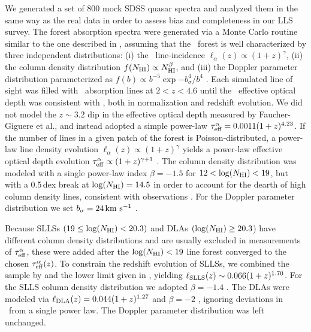 \documentclass[12pt,preprint]{aastex}
\begin{document}
We generated a set of 800 mock SDSS quasar 
spectra and analyzed them in the same way as the real data in 
order to assess bias and completeness in our LLS survey. 
The  forest absorption spectra 
were generated via a Monte Carlo routine similar 
to the one described in \cite{dww08}, 
assuming that the \lya\ forest is well characterized by 
three independent distributions: 
(i) the \lya\
line-incidence $\ell_\alpha (z) \propto (1+z)^\gamma$, 
(ii) the  column density distribution $f(N_{\rm HI}) \propto N_{\rm HI}^\beta$, 
and (iii) the Doppler parameter distribution parameterized as 
$f(b) \propto b^{-5} \exp{-b_\sigma^4/b^4}$ \citep{hr99}. 
Each simulated line of sight was filled with  \lya\ absorption lines at 
$2<z<4.6$ until the \ion{H}{1} \lya\ effective optical depth was consistent with 
\cite{fpl+08}, both in normalization and redshift evolution. We did not model the 
$z\sim 3.2$ dip in the effective optical depth 
measured by Faucher-Giguere et al., 
and instead adopted a simple power-law 
$\tau_{\rm eff}^{\alpha} =0.0011(1+z)^{4.23}$. 
If the number of lines in a given patch of the forest is 
Poisson-distributed, a power-law line density evolution 
$\ell_\alpha (z) \propto (1+z)^\gamma$ yields a power-law 
effective optical depth evolution $\tau_{\rm eff}^\alpha
\propto (1+z)^{\gamma+1}$ \citep{zuo93}. 
The column density distribution was modeled with a single power-law index 
$\beta=-1.5$ for $12<\log(N_{\rm HI})<19$, but with a 0.5\,dex break at 
$\log(N_{\rm HI})=14.5$ in order to account for the dearth of high column density lines, 
consistent with observations \citep[e.g.][]{hkc+95,kim02}. 
For the Doppler parameter distribution we set 
$b_\sigma=24 \, {\rm km~s^{-1}}$ \citep{kim+01}. 

Because SLLSs $(19 \le \log(N_{\rm HI})<20.3)$ and DLAs $(\log(N_{\rm HI}) \ge 20.3$) have 
different column density distributions and are usually excluded in 
measurements of $\tau_{\rm eff}^\alpha$,
these were added after the $\log(N_{\rm HI})<19$ 
line forest converged to the chosen $\tau_{\rm eff}^\alpha (z)$. 
To constrain the redshift evolution of SLLSs, we combined the sample by 
\cite{opb+07} and the lower limit given in \cite{rtn06}, 
yielding $\ell_{\rm SLLS} (z) \sim 0.066(1+z)^{1.70}$. 
For the SLLS column density distribution we adopted $\beta=-1.4$ 
\citep{opb+07}. 
The DLAs were modeled via $\ell_{\rm DLA} (z) =0.044(1+z)^{1.27}$ \citep{rtn06} 
and $\beta=-2$ \citep{phw05}, 
ignoring deviations in \fnhi\ from a single power law. 
The Doppler parameter distribution was left unchanged.
\end{document}
